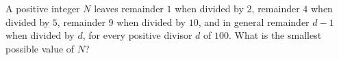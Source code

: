 A positive integer $N$ leaves remainder $1$ when divided by $2$, remainder $4$ when divided by $5$, remainder $9$ when divided by $10$, and in general remainder $d-1$ when divided by $d$, for every positive divisor $d$ of $100$. What is the smallest possible value of $N$?
